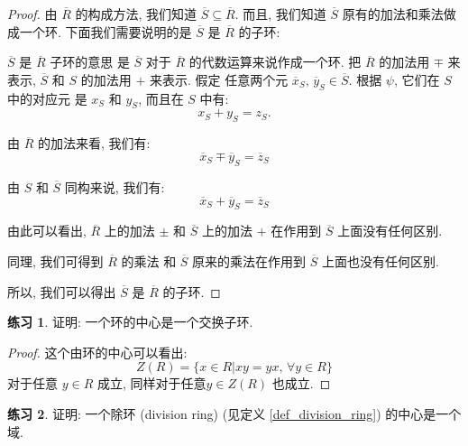 \documentclass[utf8]{ctexbook}
\theoremstyle{definition}
\newtheorem{exercise}{练习}[section]
\begin{document}
\begin{proof}
由 $\overline{R}$ 的构成方法, 我们知道 $\overline{S} \subseteq \overline{R}$. 而且, 我们知道 $\overline{S}$ 原有的加法和乘法做成一个环. 下面我们需要说明的是 $\overline{S}$ 是 $\overline{R}$ 的子环: 


$\overline{S}$ 是 $\overline{R}$ 子环的意思 是 $\overline{S}$ 对于 $\overline{R}$ 的代数运算来说作成一个环. 把 $\overline{R}$ 的加法用 $\mp$ 来表示, $\overline{S}$ 和 $S$ 的加法用 $+$ 来表示. 假定 任意两个元 $\overline{x}_S, \,  \overline{y}_S \in \overline{S}$. 根据 $\psi$, 它们在 $S$ 中的对应元 是 $x_S$ 和 $y_S$, 而且在 $S$ 中有:
\begin{equation}
x_S + y_S = z_S  .
\end{equation}

由 $\overline{R}$ 的加法来看, 我们有:
\begin{equation}
\overline{x}_S \mp \overline{y}_S = \overline{z}_S
\end{equation}

由 $S$ 和 $\overline{S}$ 同构来说, 我们有:
\begin{equation}
\overline{x}_S + \overline{y}_S = \overline{z}_S
\end{equation}

由此可以看出, $\overline{R}$ 上的加法 $\pm$ 和 $\overline{S}$ 上的加法 $+$ 在作用到 $\overline{S}$ 上面没有任何区别.

同理, 我们可得到 $\overline{R}$ 的乘法 和 $\overline{S}$ 原来的乘法在作用到 $\overline{S}$ 上面也没有任何区别.

所以, 我们可以得出 $\overline{S}$ 是 $\overline{R}$ 的子环.
\end{proof}


\begin{exercise}
证明: 一个环的中心是一个交换子环.
\end{exercise}

\begin{proof}
这个由环的中心可以看出:
\begin{equation}
Z(R) = \{ x \in R | xy = yx, \, \forall y \in R \}
\end{equation}
对于任意 $y \in R$ 成立, 同样对于任意$y \in Z(R)$ 也成立.
\end{proof}


\begin{exercise}
证明: 一个除环 (division ring) (见定义 \ref{def_division_ring}) 的中心是一个域.
\end{exercise}
\end{document}
